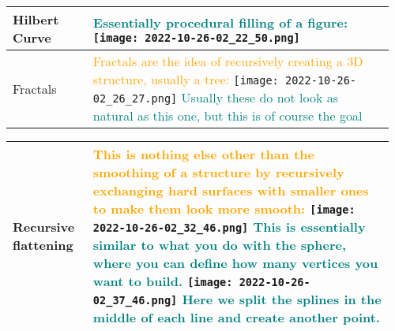 \documentclass[main.tex,fontsize=8pt,paper=a4,paper=portrait,DIV=calc,]{scrartcl}
\begin{document}
\begin{table}[ht!]
\begin{tabular}{|m{0.2\linewidth}|m{0.755\linewidth}|}
\hline
Hilbert Curve & 
\textcolor{teal}{Essentially procedural filling of a figure:}\newline 
\texttt{[image: 2022-10-26-02\_22\_50.png]}\\
\hline
Fractals & 
\textcolor{orange}{Fractals are the idea of recursively creating a 3D structure, usually a tree:}\newline
\texttt{[image: 2022-10-26-02\_26\_27.png]}\newline
\textcolor{teal}{Usually these do not look as natural as this one, but this is of course the goal}\\
\hline
\end{tabular}
\end{table}
\pagebreak
\begin{table}[ht!]
\begin{tabular}{|m{0.2\linewidth}|m{0.755\linewidth}|}
\hline
Recursive flattening & 
\textcolor{orange}{This is nothing else other than the smoothing of a structure by recursively exchanging hard surfaces with smaller ones to make them look more smooth:}\newline
\texttt{[image: 2022-10-26-02\_32\_46.png]}\newline
\textcolor{teal}{This is essentially similar to what you do with the sphere, where you can define how many vertices you want to build.}\newline
\texttt{[image: 2022-10-26-02\_37\_46.png]}\newline
\textcolor{teal}{Here we split the splines in the middle of each line and create another point.}\\
\hline
\end{tabular}

\end{table}
\end{document}
